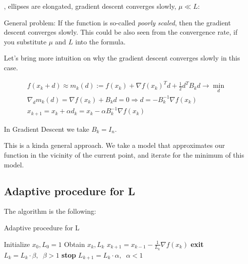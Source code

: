 , ellipses are elongated, gradient descent converges slowly, $\mu \ll L$: 


\notice \; General problem: If the function is so-called \textit{poorly scaled}, then the gradient descent converges slowly. This could be also seen from the convergence rate, if you substitute $\mu$ and $L$ into the formula.

Let's bring more intuition on why the gradient descent converges slowly in this case. 

\begin{gather*}
    f(x_k + d) \approx m_k(d) := f(x_k) + \nabla f(x_k)^T d + \frac{1}{2} d^T B_k d \to \min_{d} \\ 
    \nabla_d m_k(d) = \nabla f(x_k) + B_k d = 0 \Longrightarrow d = -B_k^{-1} \nabla f(x_k) \\ 
    x_{k+1} = x_k + \alpha d_k = x_k - \alpha B_k^{-1} \nabla f(x_k)
\end{gather*}

\notice \; In Gradient Descent we take $B_k = I_n$. 

This is a kinda general approach. We take a model that approximates our function in the vicinity of the current point, and iterate for the minimum of this model.

\subsection{Adaptive procedure for L}

The algorithm is the following:

\begin{algorithm}
    \caption{Adaptive procedure for L}
    \begin{algorithmic}[1]
    \State Initialize $x_0, L_0 = 1$
        \State Obtain $x_k, L_k$
            \State $x_{k+1} = x_{k-1} - \frac{1}{L_k} \nabla f(x_k)$
                \State \textbf{exit}
            \EndIf
            \State $L_k = L_k \cdot \beta, \;\; \beta > 1$
        \EndWhile
            \State \textbf{stop}
        \EndIf
        \State $L_{k+1} = L_k \cdot \alpha, \;\; \alpha < 1$
    \EndFor
\end{algorithmic}
\end{algorithm}

